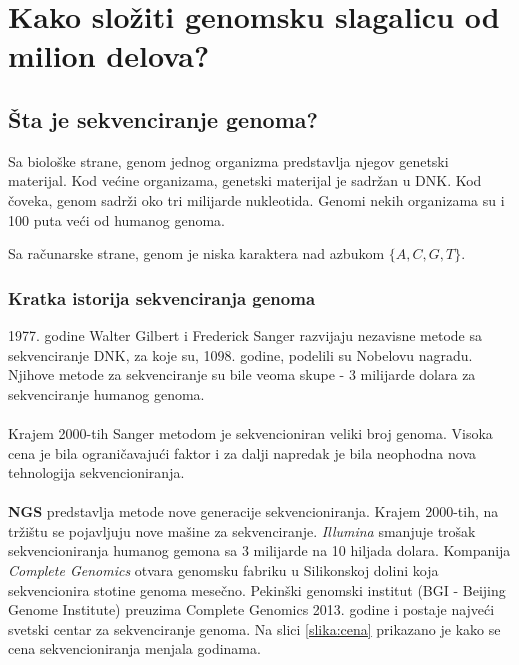 \chapter{Kako složiti genomsku slagalicu od milion delova?}

\section{Šta je sekvenciranje genoma?}

Sa biološke strane, genom jednog organizma predstavlja njegov genetski materijal. Kod većine organizama, genetski materijal je sadržan u DNK. Kod čoveka, genom sadrži oko tri milijarde nukleotida. Genomi nekih organizama su i 100 puta veći od humanog genoma. 

Sa računarske strane, genom je niska karaktera nad azbukom $\{A, C, G, T\}$.


\subsection{Kratka istorija sekvenciranja genoma}

1977. godine Walter Gilbert i Frederick Sanger razvijaju nezavisne metode sa sekvenciranje DNK, za koje su, 1098. godine, podelili su Nobelovu nagradu.
Njihove metode za sekvenciranje su bile veoma skupe - 3 milijarde dolara za sekvenciranje humanog genoma.
\\
\\
Krajem 2000-tih Sanger metodom je sekvencioniran veliki broj genoma. Visoka cena je bila ograničavajući faktor i za dalji napredak je bila neophodna nova tehnologija sekvencioniranja.
\\
\\
\textbf{NGS} predstavlja metode nove generacije sekvencioniranja. Krajem 2000-tih, na tržištu se pojavljuju nove mašine za sekvenciranje. \textit{Illumina} smanjuje trošak sekvencioniranja humanog gemona sa 3 milijarde na 10 hiljada dolara. Kompanija \textit{Complete Genomics} otvara genomsku fabriku u Silikonskoj dolini koja sekvencionira stotine genoma mesečno.
Pekinški genomski institut (BGI - Beijing Genome Institute) preuzima Complete Genomics 2013. godine i postaje najveći svetski centar za sekvenciranje genoma.
Na slici \ref{slika:cena} prikazano je kako se cena sekvencioniranja menjala godinama.


